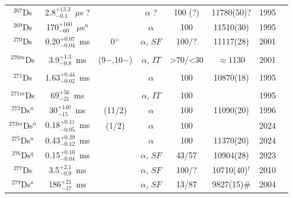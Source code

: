\begin{center}
\begin{longtable}{c|ccccccl}
$^{267}$Ds	& 2.8$^{+13.3}_{-0.1}$~$\mu$s ?&&$\alpha$	?	&100	(?)	&11780(50)?		    &1995	&{\tiny\cite{Ghiorso1995,Karol2001}}\\
$^{269}$Ds	& 170$^{+160}_{-60}$~$\mu$s$^u$& &$\alpha$		&100		&11510(30)		    &1995	&{\tiny\cite{Hofmann1995,Hofmann2000,Hofmann2002}}\\
$^{270}$Ds	& 0.20$^{+0.07}_{-0.04}$~ms&0$^+$&$\alpha$, $SF$&100/?	&11117(28)		        &2001	&{\tiny\cite{Hofmann2001,Hofmann2002,Ackermann2011,Ackermann2011a,Ackermann2015b,Kondev2015}}\\
			&				&			&					&			& 				    &		&{\tiny\cite{Muenzenberg2015,Ackermann2017}}\\
$^{270m}$Ds	& 3.9$^{+1.3}_{-0.8}$~ms&(9$-$,10$-$)&$\alpha$, $IT$&>70/<30&$\approx$1130      &2001	&{\tiny\cite{Hofmann2001,Hofmann2002,Ackermann2011,Ackermann2011a,Ackermann2015b,Kondev2015}}\\
			&				&			&					&			& 				    &		&{\tiny\cite{Muenzenberg2015,Ackermann2017}}\\
$^{271}$Ds	& 1.63$^{+0.44}_{-0.02}$~ms&&$\alpha$			&100		&10870(18)		    &1995	&{\tiny\cite{Hofmann1995b,Hofmann1995a,Hofmann1997,Hofmann1997a,Hofmann1998,Hofmann2000}}\\
			&				&			&					&			& 				    &		&{\tiny\cite{Karol2001,Hofmann2002,Folden2004,Morita2004,Morimoto2004,Morita2004a}}\\
$^{271m}$Ds	& 69$^{+56}_{-21}$~ms& 		&$\alpha$, $IT$		&100		&				    &1995	&{\tiny\cite{Hofmann1995b,Hofmann2000,Morita2004}}\\
$^{273}$Ds$^n$& 30$^{+140}_{-15}$~ms&(11/2)&$\alpha$		&100		&11090(20)		    &1996	&{\tiny\cite{Lazarev1996,Hofmann1996,Hofmann1998,Karol2003,Oganessian2024}}\\
$^{273m}$Ds$^n$&0.18$^{+0.11}_{-0.05}$~ms&(1/2)&$\alpha$	&100		& 				    &2024	&{\tiny\cite{Oganessian2024}}\\
$^{275}$Ds$^n$& 0.43$^{+0.29}_{-0.12}$~ms&&$\alpha$		    &100		&11370(20)		    &2024	&{\tiny\cite{Oganessian2024}}\\
$^{276}$Ds$^q$& 0.15$^{+0.10}_{-0.04}$~ms&&$\alpha$, $SF$	&43/57		&10904(28)		    &2023	&{\tiny\cite{Oganessian2023}}\\
$^{277}$Ds	& 3.5$^{+2.1}_{-0.9}$~ms& 	&$\alpha$, $SF$		&100/?		&10710(40)$^t$	    &2010	&{\tiny\cite{Ellison2010,Utyonkov2015,Utyonkov2018}}\\
$^{279}$Ds$^o$& 186$^{+21}_{-17}$~ms& 	&$\alpha$, $SF$		&13/87      &9827(15)$\#$	    &2004	&{\tiny\cite{Oganessian2004,Oganessian2004a,Gregorich2005,Oganessian2022b}}\\

\end{longtable}
\end{center}
